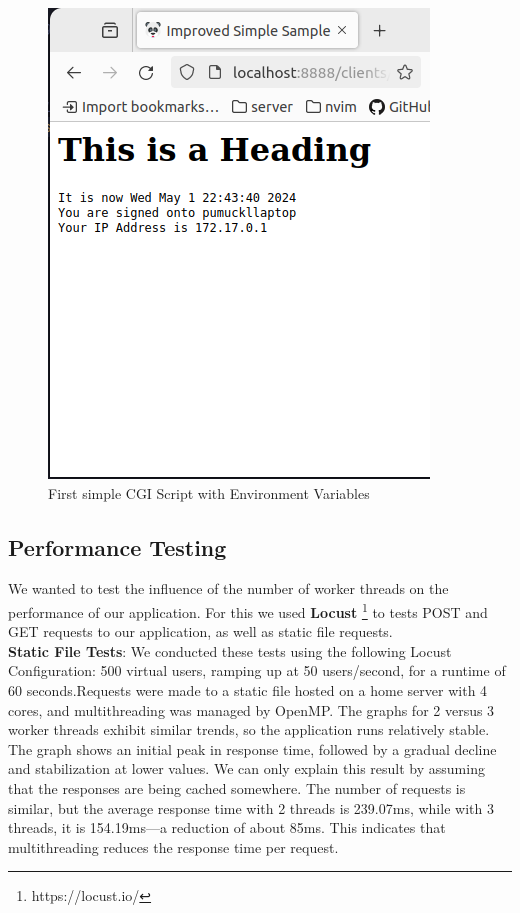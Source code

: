 \begin{figure}[h]
\begin{minipage}{0.35\textwidth}
        \includegraphics[width=\textwidth]{figures/cgi.png}
        \caption{First simple CGI Script with Environment Variables}
    \end{minipage}
\end{figure}
\vspace{-15pt}
\subsection*{Performance Testing}
We wanted to test the influence of the number of worker threads on the performance of our application. For this we used \textbf{Locust} \footnote{https://locust.io/} to tests POST and GET requests to our application, as well as static file requests. \\

\textbf{Static File Tests}: 
We conducted these tests using the following Locust Configuration: 500 virtual users, ramping up at 50 users/second, for a runtime of 60 seconds.Requests were made to a static file hosted on a home server with 4 cores, and multithreading was managed by OpenMP.
The graphs for 2 versus 3 worker threads exhibit similar trends, so the application runs relatively stable. The graph shows an initial peak in response time, followed by a gradual decline and stabilization at lower values. We can only explain this result by assuming that the responses are being cached somewhere.
The number of requests is similar, but the average response time with 2 threads is 239.07ms, while with 3 threads, it is 154.19ms—a reduction of about 85ms. This indicates that multithreading reduces the response time per request.


